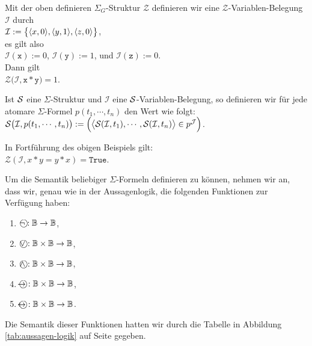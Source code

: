 \example
Mit der oben definieren $\Sigma_G$-Struktur
$\mathcal{Z}$ definieren wir eine $\mathcal{Z}$-Variablen-Belegung $\mathcal{I}$ durch
\\[0.2cm]
\hspace*{1.3cm} $\mathcal{I} := \bigl\{ \pair(x,0), \pair(y,1), \pair(z,0)\bigr\}$,
\\[0.2cm]
es gilt also
\\[0.2cm]
\hspace*{1.3cm} $\mathcal{I}(\mathtt{x}) := 0$, \quad $\mathcal{I}(\mathtt{y}) := 1$, \quad und \quad $\mathcal{I}(\mathtt{z}) := 0$.
\\[0.2cm]
Dann gilt  \\[0.2cm]
\hspace*{1.3cm}  $\mathcal{Z}\bigl(\mathcal{I}, \mathtt{x} * \mathtt{y} \bigr) = 1$. \eox

\begin{Definition}
    Ist $\mathcal{S}$ eine $\Sigma$-Struktur und $\mathcal{I}$ eine $\mathcal{S}$-Variablen-Belegung,
    so definieren wir für jede atomare $\Sigma$-Formel 
    $p(t_1, \cdots, t_n)$ den Wert  wie folgt: \\[0.2cm]
    \hspace*{1.3cm}
    $\mathcal{S}\bigl(\mathcal{I}, p(t_1,\cdots,t_n)\bigr) := 
       \Bigl(\bigl\langle \mathcal{S}(\mathcal{I}, t_1), \cdots, \mathcal{S}(\mathcal{I}, t_n) \bigr\rangle \in p^\mathcal{J}\Bigr)$.
    \eox
\end{Definition}

\example
In Fortführung des obigen Beispiels gilt: 
\\[0.2cm]
\hspace*{1.3cm} 
$\mathcal{Z}(\mathcal{I},x * y = y * x) = \mathtt{True}$.
\eox

Um die Semantik beliebiger $\Sigma$-Formeln definieren zu können, nehmen wir an, dass wir,
genau wie in der Aussagenlogik, die folgenden Funktionen zur Verfügung haben:
\begin{enumerate}
\item $\circneg: \mathbb{B} \rightarrow \mathbb{B}$,
\item $\circvee: \mathbb{B} \times \mathbb{B} \rightarrow \mathbb{B}$,
\item $\circwedge: \mathbb{B} \times \mathbb{B} \rightarrow \mathbb{B}$,
\item $\circright: \mathbb{B} \times \mathbb{B} \rightarrow \mathbb{B}$,
\item $\circleftright: \mathbb{B} \times \mathbb{B} \rightarrow \mathbb{B}$.
\end{enumerate}
Die Semantik dieser Funktionen hatten wir durch die Tabelle in Abbildung
\ref{tab:aussagen-logik} auf Seite \pageref{tab:aussagen-logik} gegeben. 

